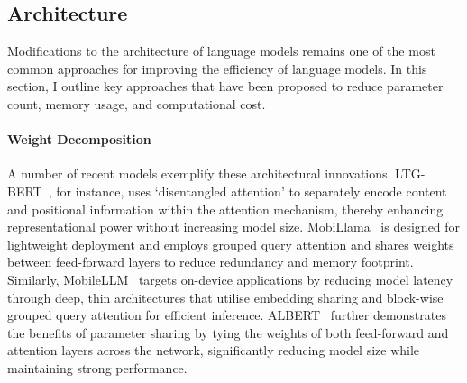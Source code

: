 \subsection{Architecture}

Modifications to the architecture of language models remains one of the most common approaches for improving the efficiency of language models. In this section, I outline key approaches that have been proposed to reduce parameter count, memory usage, and computational cost.

\paragraph{Weight Decomposition}
A number of recent models exemplify these architectural innovations. LTG-BERT~\citep{samuel2023ltgbert}, for instance, uses `disentangled attention' to separately encode content and positional information within the attention mechanism, thereby enhancing representational power without increasing model size. MobiLlama~\citep{thawakar2024mobillama} is designed for lightweight deployment and employs grouped query attention and shares weights between feed-forward layers to reduce redundancy and memory footprint. Similarly, MobileLLM~\citep{liu2024mobilellm} targets on-device applications by reducing model latency through deep, thin architectures that utilise embedding sharing and block-wise grouped query attention for efficient inference. ALBERT~\citep{lan2019albert} further demonstrates the benefits of parameter sharing by tying the weights of both feed-forward and attention layers across the network, significantly reducing model size while maintaining strong performance.


